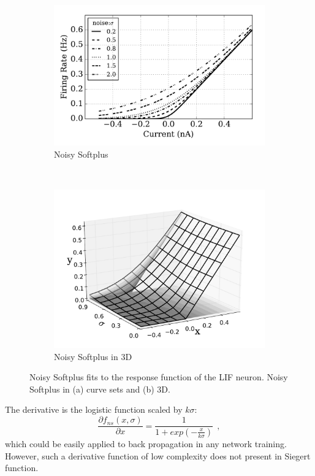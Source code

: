 \documentclass[runningheads,a4paper]{llncs}
\begin{document}
\begin{figure}[thb!]
	\centering
	\begin{subfigure}[t]{0.6\textwidth}
		\includegraphics[width=\textwidth]{4.pdf}
		\caption{Noisy Softplus}
	\end{subfigure}\\
	\begin{subfigure}[t]{0.7\textwidth}
		\includegraphics[width=\textwidth]{5.pdf}
		\caption{Noisy Softplus in 3D}
	\end{subfigure}
	\caption{
		Noisy Softplus fits to the response function of the LIF neuron.
		Noisy Softplus in (a) curve sets and (b) 3D.}
	\label{fig:nsp}
\end{figure}	

The derivative is the logistic function scaled by $k\sigma$:
\begin{equation}
\frac{\partial f_{ns}(x,\sigma)}{\partial x} = \frac{1}{1+exp(-\frac{x}{k\sigma})}~~,
\label{equ:logist}
\end{equation}	
which could be easily applied to back propagation in any network training.
However, such a derivative function of low complexity does not present in Siegert function.
\end{document}
